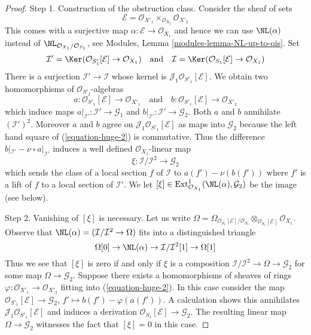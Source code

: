 \begin{proof}
\medskip\noindent
Step 1. Construction of the obstruction class. Consider the sheaf
of sets
$$
\mathcal{E} = \mathcal{O}_{X'_1} \times_{\mathcal{O}_{X_2}} \mathcal{O}_{X'_2}
$$
This comes with a surjective map $\alpha : \mathcal{E} \to \mathcal{O}_{X_1}$
and hence we can use $\NL(\alpha)$ instead of
$\NL_{\mathcal{O}_{X_1}/\mathcal{O}_{S_1}}$, see
Modules, Lemma \ref{modules-lemma-NL-up-to-qis}.
Set
$$
\mathcal{I}' =
\Ker(\mathcal{O}_{S'_1}[\mathcal{E}] \to \mathcal{O}_{X_1})
\quad\text{and}\quad
\mathcal{I} =
\Ker(\mathcal{O}_{S_1}[\mathcal{E}] \to \mathcal{O}_{X_1})
$$
There is a surjection $\mathcal{I}' \to \mathcal{I}$ whose kernel
is $\mathcal{J}_1\mathcal{O}_{S'_1}[\mathcal{E}]$.
We obtain two homomorphisms of $\mathcal{O}_{S'_2}$-algebras
$$
a : \mathcal{O}_{S'_1}[\mathcal{E}] \to \mathcal{O}_{X'_1}
\quad\text{and}\quad
b : \mathcal{O}_{S'_1}[\mathcal{E}] \to \mathcal{O}_{X'_2}
$$
which induce maps $a|_{\mathcal{I}'} : \mathcal{I}' \to \mathcal{G}_1$ and
$b|_{\mathcal{I}'} : \mathcal{I}' \to \mathcal{G}_2$. Both $a$ and $b$
annihilate $(\mathcal{I}')^2$. Moreover $a$ and $b$ agree on
$\mathcal{J}_1\mathcal{O}_{S'_1}[\mathcal{E}]$ as maps into $\mathcal{G}_2$
because the left hand square of (\ref{equation-huge-2}) is commutative.
Thus the difference
$b|_{\mathcal{I}'} - \nu \circ a|_{\mathcal{I}'}$
induces a well defined $\mathcal{O}_{X_1}$-linear map
$$
\xi : \mathcal{I}/\mathcal{I}^2 \longrightarrow \mathcal{G}_2
$$
which sends the class of a local section $f$ of $\mathcal{I}$ to
$a(f') - \nu(b(f'))$ where $f'$ is a lift of $f$ to a local
section of $\mathcal{I}'$. We let
$[\xi] \in \text{Ext}^1_{\mathcal{O}_{X_1}}(\NL(\alpha), \mathcal{G}_2)$
be the image (see below).

\medskip\noindent
Step 2. Vanishing of $[\xi]$ is necessary. Let us write
$\Omega = \Omega_{\mathcal{O}_{S_1}[\mathcal{E}]/\mathcal{O}_{S_1}}
\otimes_{\mathcal{O}_{S_1}[\mathcal{E}]} \mathcal{O}_{X_1}$.
Observe that $\NL(\alpha) = (\mathcal{I}/\mathcal{I}^2 \to \Omega)$
fits into a distinguished triangle
$$
\Omega[0] \to
\NL(\alpha) \to
\mathcal{I}/\mathcal{I}^2[1] \to
\Omega[1]
$$
Thus we see that $[\xi]$ is zero if and only if $\xi$
is a composition $\mathcal{I}/\mathcal{I}^2 \to \Omega \to \mathcal{G}_2$
for some map $\Omega \to \mathcal{G}_2$. Suppose there exists a
homomorphisms of sheaves of rings
$\varphi : \mathcal{O}_{X'_1} \to \mathcal{O}_{X'_2}$ fitting into
(\ref{equation-huge-2}). In this case consider the map
$\mathcal{O}_{S'_1}[\mathcal{E}] \to \mathcal{G}_2$,
$f' \mapsto b(f') - \varphi(a(f'))$. A calculation
shows this annihilates $\mathcal{J}_1\mathcal{O}_{S'_1}[\mathcal{E}]$
and induces a derivation $\mathcal{O}_{S_1}[\mathcal{E}] \to \mathcal{G}_2$.
The resulting linear map $\Omega \to \mathcal{G}_2$ witnesses the
fact that $[\xi] = 0$ in this case.


\end{proof}

